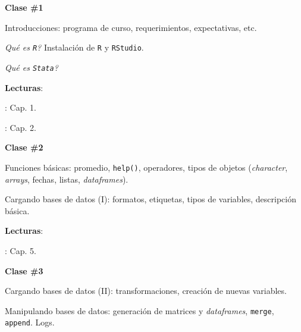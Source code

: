 \documentclass[letterpaper]{article}
\renewenvironment{itemize}{
  \begin{list}{}{
    \setlength{\leftmargin}{1.5em}
  }
}{
  \end{list}
}
\begin{document}
\begin{enumerate}
	\item {}

			\begin{itemize} 
				\item[$\bullet$] {\bf Clase \#1}
				\begin{itemize} 
					\item[$\circ$] Introducciones: programa de curso, requerimientos, expectativas, etc.
					\item[$\circ$] \emph{Qu\'e es \texttt{R}?} Instalaci\'on de \texttt{R} y \texttt{RStudio}.
          \item[$\circ$] \emph{Qu\'e es \texttt{Stata}?}
					\item[$\circ$] {\bf Lecturas}: 
						\begin{itemize} 
							\item[$\diamond$] \textcite{Wooldridge2010}: Cap. 1.
							\item[$\diamond$] \textcite{Urdinez:2019aa}: Cap. 2.
						\end{itemize}
				\end{itemize}
			\end{itemize}






			\begin{itemize} 
				\item[$\bullet$] {\bf Clase \#2}
				\begin{itemize} 
					\item[$\circ$] Funciones b\'asicas: promedio, \texttt{help()}, operadores, tipos de objetos (\emph{character}, \emph{arrays}, fechas, listas, \emph{dataframes}).
					\item[$\circ$] Cargando bases de datos (I): formatos, etiquetas, tipos de variables, descripci\'on b\'asica. %
					\item[$\circ$] {\bf Lecturas}: 
					\begin{itemize}
						\item[$\diamond$] \textcite{Urdinez:2019aa}: Cap. 5.
					\end{itemize}
				\end{itemize}
			\end{itemize}




			\begin{itemize} 
				\item[$\bullet$] {\bf Clase \#3}
					\begin{itemize} 
				\item[$\circ$] Cargando bases de datos (II): transformaciones, creaci\'on de nuevas variables.
				\item[$\circ$] Manipulando bases de datos: generaci\'on de matrices y \emph{dataframes}, \texttt{merge}, \texttt{append}. Logs.  %
					\end{itemize}
			\end{itemize}





\end{enumerate}
\end{document}
